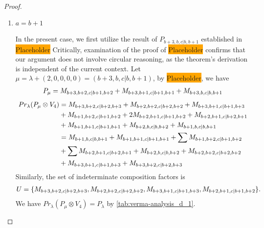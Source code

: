 \begin{proof}
\begin{enumerate}
\begin{enumerate}
        \item $a=b+1$ \par
        In the present case, we first utilize the result of $P_{b+3,b,c|b,b+1}$ established in \colorbox{orange}{Placeholder} Critically, examination of the proof of \colorbox{orange}{Placeholder} confirms that our argument does not involve circular reasoning, as the theorem's derivation is independent of the current context. Let $\mu = \lambda + (2,0,0,0,0) =(b+3,b,c|b,b+1) $, by \colorbox{orange}{Placeholder}, we have
        \begin{equation}\notag
          \begin{aligned}
            P_\mu = 
M_{b+3,b+2,c|b+1,b+2}
+M_{b+3,b+1,c|b+1,b+1}
+M_{b+3,b,c|b,b+1}
          \end{aligned}
        \end{equation}
        \begin{equation}\notag
          \begin{aligned}
            Pr_{\lambda}(P_\mu \otimes V_{4}) &=
M_{b+3,b+2,c|b+2,b+3}
+ M_{b+2,b+2,c|b+2,b+2}
+ M_{b+3,b+1,c|b+1,b+3}\\
                                              &
+ M_{b+1,b+2,c|b+1,b+2}
+ 2M_{b+2,b+1,c|b+1,b+2}
+ M_{b+2,b+1,c|b+2,b+1}\\
                                              &
+ M_{b+1,b+1,c|b+1,b+1}
+ M_{b+2,b,c|b,b+2}
+ M_{b+1,b,c|b,b+1} \\
                                               &=
 M_{b+1,b,c|b,b+1}
+  M_{b+1,b+1,c|b+1,b+1}
+ \sum M_{b+1,b+2,c|b+1,b+2}\\
                                              &
+ \sum M_{b+2,b+1,c|b+2,b+1}
+  M_{b+2,b,c|b,b+2}
+  M_{b+2,b+2,c|b+2,b+2}\\
                                              &
+  M_{b+3,b+1,c|b+1,b+3}
+  M_{b+3,b+2,c|b+2,b+3}
          \end{aligned}
        \end{equation}
      Similarly, the set of indeterminate composition factors is 
\begin{equation}\notag
  \begin{aligned}
    U = \{
M_{b+3,b+2,c|b+2,b+3},
M_{b+2,b+2,c|b+2,b+2},
M_{b+3,b+1,c|b+1,b+3},
M_{b+2,b+1,c|b+1,b+2}
\}.
  \end{aligned}
\end{equation}
       We have $Pr_{\lambda}(P_\mu \otimes V_{4}) = P_\lambda  $ by \cref{tab:verma-analysis_d_1}.
\begin{table}[htbp]

\end{table}
\end{enumerate}
\end{enumerate}
\end{proof}
